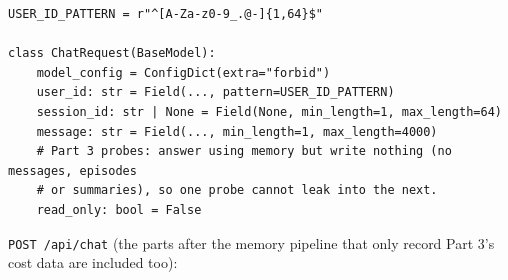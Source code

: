 \documentclass[11pt]{article}
\begin{document}
\begingroup\lstset{basicstyle=\ttfamily\scriptsize}
\begin{lstlisting}
USER_ID_PATTERN = r"^[A-Za-z0-9_.@-]{1,64}$"

class ChatRequest(BaseModel):
    model_config = ConfigDict(extra="forbid")
    user_id: str = Field(..., pattern=USER_ID_PATTERN)
    session_id: str | None = Field(None, min_length=1, max_length=64)
    message: str = Field(..., min_length=1, max_length=4000)
    # Part 3 probes: answer using memory but write nothing (no messages, episodes
    # or summaries), so one probe cannot leak into the next.
    read_only: bool = False
\end{lstlisting}
\endgroup
\texttt{POST /api/chat} (the parts after the memory pipeline that only record Part 3's cost data are included too):

\begingroup\lstset{basicstyle=\ttfamily\scriptsize}
\end{document}
